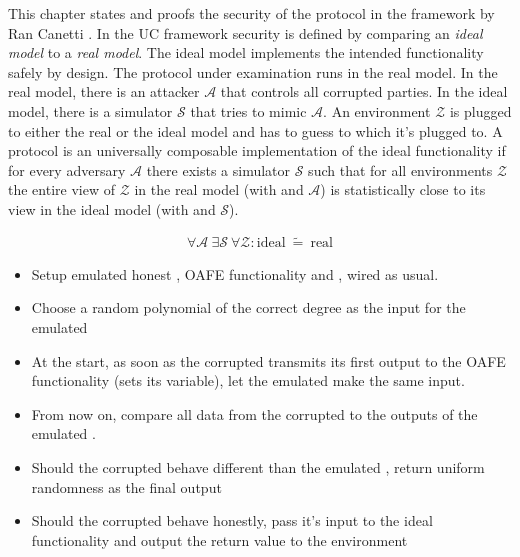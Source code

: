 \label{sec:security}

This chapter states and proofs the security of the protocol in the
 framework by Ran Canetti \cite{canetti05}.
In the UC framework security is defined by comparing an \emph{ideal model} to a
\emph{real model}. The ideal model implements the intended functionality
\JWfuncSym{}{} safely by design.  The protocol under examination runs in the
real model. In the real model, there is an attacker $\mathcal{A}$ that controls
all corrupted parties.  In the ideal model, there is a simulator $\mathcal{S}$
that tries to mimic $\mathcal{A}$. An environment $\mathcal{Z}$ is plugged to
either the real or the ideal model and has to guess to which it's plugged to. A
protocol \JWprotoSym{}{} is an universally composable implementation of the
ideal functionality if for every adversary $\mathcal{A}$ there exists a
simulator $\mathcal{S}$ such that for all environments $\mathcal{Z}$ the entire
view of $\mathcal{Z}$ in the real model (with \JWprotoSym{}{} and $\mathcal{A}$)
is statistically close to its view in the ideal model (with \JWfuncSym{}{} and
$\mathcal{S}$).

\begin{align*}
%
\forall \mathcal{A}\ \exists \mathcal{S}\ \forall \mathcal{Z} :
\text{ideal}\ \widetilde{=}\ \text{real}
%
\end{align*}

%
%
\label{sec:simulators}


\label{sec:simulator-david}

\begin{itemize}

  \item Setup emulated honest \JWpOne{}, OAFE functionality and \JWpTwo{}, wired
    as usual.

  \item Choose a random polynomial of the correct degree as the input for the
    emulated \JWpOne{}

  \item At the start, as soon as the corrupted \JWpTwo{} transmits its first
    output to the OAFE functionality (sets its variable), let the emulated
    \JWpTwo{} make the same input.

  \item From now on, compare all data from the corrupted \JWpTwo{} to the
    outputs of the emulated \JWpTwo{}.

  \item Should the corrupted \JWpTwo{} behave different than the emulated
    \JWpTwo{}, return uniform randomness as the final output

  \item Should the corrupted \JWpTwo{} behave honestly, pass it's input to the
    ideal functionality and output the return value to the environment

\end{itemize}


